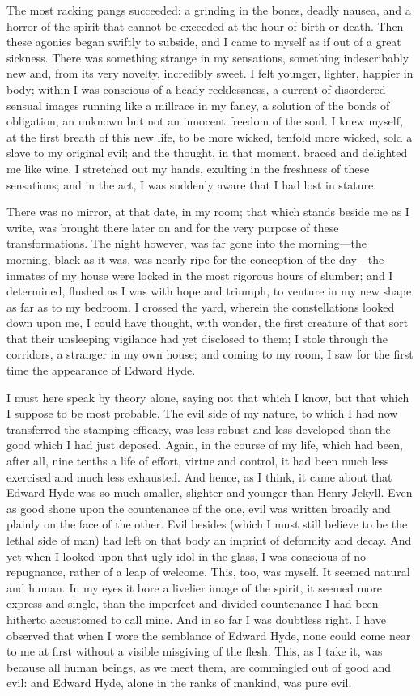 \documentclass[12pt,openright]{book}
\begin{document}
The most racking pangs succeeded: a grinding in the bones, deadly nausea, and a horror of the spirit that cannot be exceeded at the hour of birth or death. Then these agonies began swiftly to subside, and I came to myself as if out of a great sickness. There was something strange in my sensations, something indescribably new and, from its very novelty, incredibly sweet. I felt younger, lighter, happier in body; within I was conscious of a heady recklessness, a current of disordered sensual images running like a millrace in my fancy, a solution of the bonds of obligation, an unknown but not an innocent freedom of the soul. I knew myself, at the first breath of this new life, to be more wicked, tenfold more wicked, sold a slave to my original evil; and the thought, in that moment, braced and delighted me like wine. I stretched out my hands, exulting in the freshness of these sensations; and in the act, I was suddenly aware that I had lost in stature.

There was no mirror, at that date, in my room; that which stands beside me as I write, was brought there later on and for the very purpose of these transformations. The night however, was far gone into the morning—the morning, black as it was, was nearly ripe for the conception of the day—the inmates of my house were locked in the most rigorous hours of slumber; and I determined, flushed as I was with hope and triumph, to venture in my new shape as far as to my bedroom. I crossed the yard, wherein the constellations looked down upon me, I could have thought, with wonder, the first creature of that sort that their unsleeping vigilance had yet disclosed to them; I stole through the corridors, a stranger in my own house; and coming to my room, I saw for the first time the appearance of Edward Hyde.

I must here speak by theory alone, saying not that which I know, but that which I suppose to be most probable. The evil side of my nature, to which I had now transferred the stamping efficacy, was less robust and less developed than the good which I had just deposed. Again, in the course of my life, which had been, after all, nine tenths a life of effort, virtue and control, it had been much less exercised and much less exhausted. And hence, as I think, it came about that Edward Hyde was so much smaller, slighter and younger than Henry Jekyll. Even as good shone upon the countenance of the one, evil was written broadly and plainly on the face of the other. Evil besides (which I must still believe to be the lethal side of man) had left on that body an imprint of deformity and decay. And yet when I looked upon that ugly idol in the glass, I was conscious of no repugnance, rather of a leap of welcome. This, too, was myself. It seemed natural and human. In my eyes it bore a livelier image of the spirit, it seemed more express and single, than the imperfect and divided countenance I had been hitherto accustomed to call mine. And in so far I was doubtless right. I have observed that when I wore the semblance of Edward Hyde, none could come near to me at first without a visible misgiving of the flesh. This, as I take it, was because all human beings, as we meet them, are commingled out of good and evil: and Edward Hyde, alone in the ranks of mankind, was pure evil.
\end{document}
